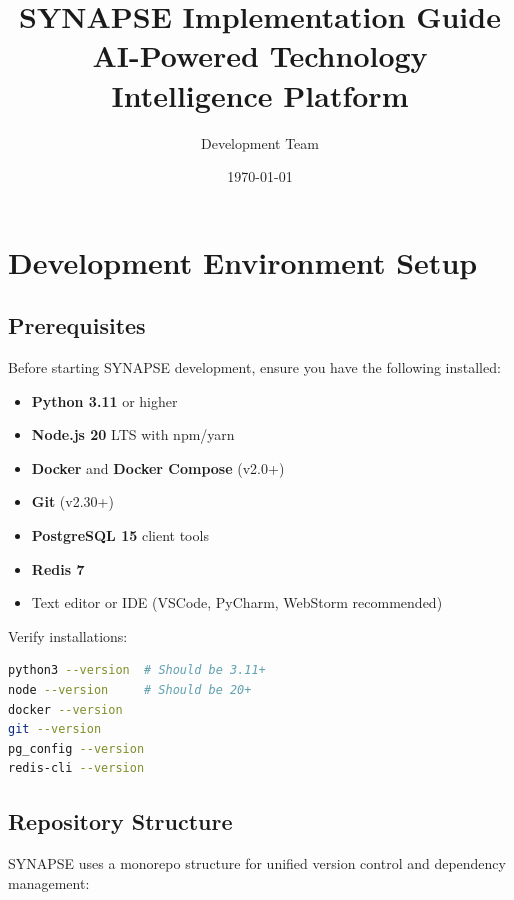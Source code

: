 \documentclass{report}
\title{\Large\textbf{SYNAPSE Implementation Guide} \\ AI-Powered Technology Intelligence Platform}
\author{Development Team}
\date{\today}
\begin{document}
\maketitle

\tableofcontents
\newpage

\chapter{Development Environment Setup}

\section{Prerequisites}

Before starting SYNAPSE development, ensure you have the following installed:

\begin{itemize}
    \item \textbf{Python 3.11} or higher
    \item \textbf{Node.js 20} LTS with npm/yarn
    \item \textbf{Docker} and \textbf{Docker Compose} (v2.0+)
    \item \textbf{Git} (v2.30+)
    \item \textbf{PostgreSQL 15} client tools
    \item \textbf{Redis 7}
    \item Text editor or IDE (VSCode, PyCharm, WebStorm recommended)
\end{itemize}

Verify installations:

\begin{lstlisting}[language=bash, caption=Verify prerequisites]
python3 --version  # Should be 3.11+
node --version     # Should be 20+
docker --version
git --version
pg_config --version
redis-cli --version
\end{lstlisting}

\section{Repository Structure}

SYNAPSE uses a monorepo structure for unified version control and dependency management:
\end{document}
